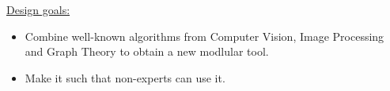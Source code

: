 \documentclass[	hyperref={pdfpagelabels=false}, xcolor=dvipsnames,
		11pt]{beamer}
\begin{document}
\begin{frame}
\begin{columns}
\begin{column}{3cm}
\begin{overprint}
{\begin{minipage}[t]{5 cm}
\begin{figure}[h]
	\end{figure}
	     \end{minipage} }

	\end{overprint}
	\end{column}
	\end{columns}

	\vspace{-0.75cm}

		\begin{alertblock}{\underline{Design goals:}}
		\begin{itemize}
		  	\item Combine well-known algorithms from Computer Vision, Image Processing and Graph Theory to obtain a new modlular tool.
		  	\item Make it such that non-experts can use it.
		\end{itemize}
		\end{alertblock}
\end{frame}


\end{document}

